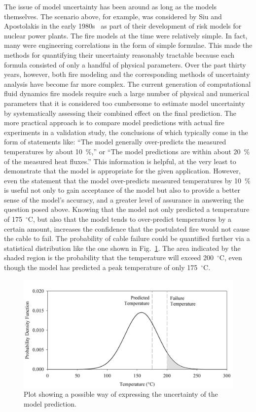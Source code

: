 The issue of model uncertainty has been around as long as the models themselves. The scenario above,
for example, was considered by Siu and Apostolakis in the early 1980s~\cite{Siu:RE1982} as part of their development of risk models for
nuclear power plants. The fire models at the
time were relatively simple. In fact, many were engineering correlations in the form of simple formulae. This made the methods for
quantifying their uncertainty reasonably tractable because each formula consisted of only a handful of physical parameters. Over the past
thirty years, however, both fire modeling and the corresponding methods of uncertainty analysis have become far more complex. The current
generation of computational fluid dynamics fire models require such a large number of physical and numerical parameters that it is considered
too cumbersome to estimate model uncertainty by systematically assessing their combined effect on the final prediction. The more
practical approach is to compare model predictions with actual fire experiments in a validation study, the conclusions of which typically come in the form of statements like:
``The model generally over-predicts the measured temperatures
by about 10~\%,'' or ``The model predictions are within about 20~\% of the measured heat fluxes.'' This information is helpful,
at the very least to demonstrate that the model is appropriate for the given application.
However, even the statement that the model over-predicts measured temperatures by 10~\% is useful not only to gain acceptance of the model but also
to provide a better sense of the model's accuracy, and a greater level of assurance in answering the question posed above. Knowing that the model
not only predicted a temperature of 175~$^\circ$C, but also that the model tends to over-predict temperatures by a certain amount, increases the confidence that
the postulated fire would not cause the cable to fail. The probability of cable failure could be quantified further via a statistical distribution
like the one shown in Fig.~\ref{bell_curve}. The area indicated by the shaded region is the probability that the temperature will exceed 200~$^\circ$C,
even though the model has predicted a peak temperature of only 175~$^\circ$C.
\begin{figure}[ht]
\begin{center}
\includegraphics[width=5.in]{FIGURES/bell_curve}
\end{center}
\caption[Demonstration of model uncertainty.]{Plot showing a possible way of expressing the uncertainty of the model prediction.}
\label{bell_curve}
\end{figure}

